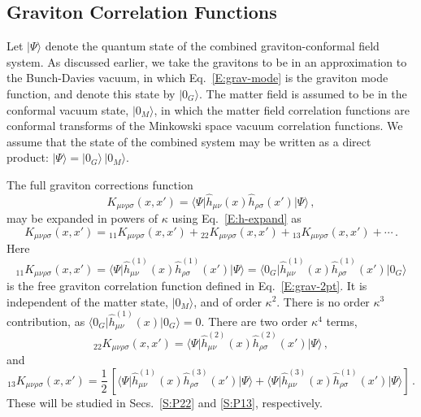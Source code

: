 \documentclass[preprint,prd,showpacs,superscriptaddress]{revtex4}
\begin{document}
\subsection{Graviton Correlation Functions}
\label{S:corr-fnts}

Let $|\Psi\rangle$ denote the quantum state of the combined graviton-conformal field system. 
As discussed earlier, we take the gravitons to be in an approximation to the Bunch-Davies vacuum,
in which Eq.~\eqref{E:grav-mode} is the graviton mode function, and denote this state by
$\vert0_{G}\rangle$. The matter field is assumed to be in the conformal vacuum state, $\vert0_{M}\rangle$,
in which the matter field correlation functions are conformal transforms of the Minkowski space
vacuum correlation functions. We assume that the state of the combined system may be written
as a direct product: $ |\Psi\rangle = \vert0_{G}\rangle \, \vert0_{M}\rangle$.

The full graviton corrections function
\begin{equation}
K_{\mu\nu\rho\sigma}(x,x')=\langle\Psi\vert\hat{h}_{\mu\nu}(x)\hat{h}_{\rho\sigma}(x')\vert\Psi\rangle\,,
\end{equation}
may be expanded in powers of $\kappa$ using Eq.~\eqref{E:h-expand} as
\begin{equation}
K_{\mu\nu\rho\sigma}(x,x')= {}_{11}K_{\mu\nu\rho\sigma}(x,x') + {}_{22}K_{\mu\nu\rho\sigma}(x,x') 
+ {}_{13}K_{\mu\nu\rho\sigma}(x,x') +\cdots \,.
\end{equation}
Here
\begin{equation}
 {}_{11}K_{\mu\nu\rho\sigma}(x,x') = 
 \langle\Psi\vert\hat{h}^{(1)}_{\mu\nu}(x)\hat{h}^{(1)}_{\rho\sigma}(x')\vert\Psi\rangle =
 \langle 0_G\vert\hat{h}^{(1)}_{\mu\nu}(x)\hat{h}^{(1)}_{\rho\sigma}(x')\vert 0_G \rangle 
\end{equation}
is the free graviton correlation function defined in Eq.~\eqref{E:grav-2pt}. It is independent of the matter
state, $\vert0_{M}\rangle$, and of order $\kappa^2$. There is no order $\kappa^3$ contribution, as
$\langle 0_G\vert\hat{h}^{(1)}_{\mu\nu}(x)\vert 0_G \rangle =0$. There are two  order $\kappa^4$ terms, 
\begin{equation}
{}_{22}K_{\mu\nu\rho\sigma}(x,x') = 
 \langle\Psi\vert\hat{h}^{(2)}_{\mu\nu}(x)\hat{h}^{(2)}_{\rho\sigma}(x')\vert\Psi\rangle\,,
 \label{E:K22}
\end{equation}
and
\begin{equation}
{}_{13}K_{\mu\nu\rho\sigma}(x,x') = 
\frac{1}{2}\, \left[\langle\Psi\vert\hat{h}^{(1)}_{\mu\nu}(x)\hat{h}^{(3)}_{\rho\sigma}(x')\vert\Psi\rangle+
\langle\Psi\vert\hat{h}^{(3)}_{\mu\nu}(x)\hat{h}^{(1)}_{\rho\sigma}(x')\vert\Psi\rangle \right]\,.
 \label{E:K13}
\end{equation}
These will be studied in Secs.~\ref{S:P22} and \ref{S:P13}, respectively.
\end{document}
